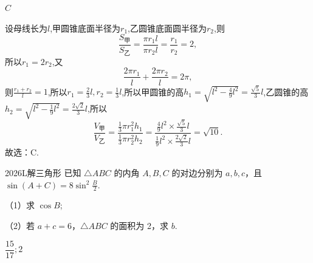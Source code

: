 \documentclass[12pt,UTF-8,a4paper]{ctexart}
\numberwithin{figure}{section}
\theoremstyle{mystyle}
\theoremstyle{mystylekaishu}
\theoremstyle{mystyle}
\numberwithin{xiti}{section}
\begin{document}
\begin{answer}
$C$
\end{answer}

\begin{solutions}
设母线长为$l$,甲圆锥底面半径为$r_1$,乙圆锥底面圆半径为$r_2$,则
$$
\frac{S_{\text{甲}}}{S_{\text{乙}}} = \frac{\pi r_1 l}{\pi r_2 l} = \frac{r_1}{r_2} = 2,
$$
所以$r_1 = 2r_2$,又
$$
\frac{2\pi r_1}{l} + \frac{2\pi r_2}{l} = 2\pi,
$$
则$\frac{r_1 + r_2}{l} = 1$,所以$r_1 = \frac{2}{3}l, r_2 = \frac{1}{3}l$,所以甲圆锥的高$h_1 = \sqrt{l^2 - \frac{4}{9}l^2} = \frac{\sqrt{5}}{3}l$,乙圆锥的高$h_2 = \sqrt{l^2 - \frac{1}{9}l^2} = \frac{2\sqrt{2}}{3}l$,所以
$$
\frac{V_{\text{甲}}}{V_{\text{乙}}} = \frac{\frac{1}{3}\pi r_1^2 h_1}{\frac{1}{3}\pi r_2^2 h_2} = \frac{\frac{4}{9}l^2 \times \frac{\sqrt{5}}{3}l}{\frac{1}{9}l^2 \times \frac{2\sqrt{2}}{3}l} = \sqrt{10}.
$$
故选：C.
\end{solutions}


\begin{problem}{2026}{L}{}{}{解三角形}
已知 $\triangle ABC$ 的内角 $A, B, C$ 的对边分别为 $a, b, c$，且 $\sin(A+C)=8\sin^2\frac{B}{2}$.

（1）求 $\cos B$;

（2）若 $a+c=6$，$\triangle ABC$ 的面积为 2，求 $b$.
\end{problem}

\begin{answer}
$\displaystyle\dfrac{15}{17}; 2$
\end{answer}
\end{document}
